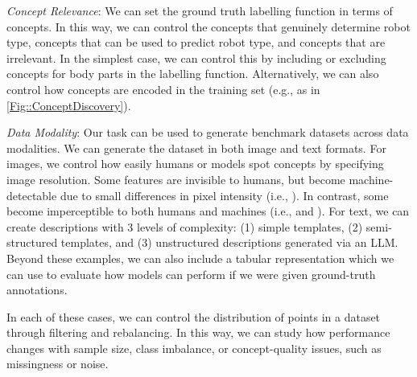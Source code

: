 \documentclass[11pt]{article}
\begin{document}
\noindent \emph{Concept Relevance}: We can set the ground truth labelling function in terms of concepts. In this way, we can control the concepts that genuinely determine robot type, concepts that can be used to predict robot type, and concepts that are irrelevant. In the simplest case, we can control this by including or excluding concepts for body parts in the labelling function. Alternatively, we can also control how concepts are encoded in the training set (e.g.,  as in \cref{Fig::ConceptDiscovery}). %

\noindent \emph{Data Modality}: Our task can be used to generate benchmark datasets across data modalities. We can generate the  dataset in both image and text formats. For images, we control how easily humans or models spot concepts by specifying image resolution. Some features are invisible to humans, but become machine-detectable due to small differences in pixel intensity (i.e., ). In contrast, some become imperceptible to both humans and machines (i.e.,  and ). For text, we can create descriptions with 3 levels of complexity: (1) simple templates, (2) semi-structured templates, and (3) unstructured descriptions generated via an LLM. Beyond these examples, we can also include a tabular representation which we can use to evaluate how models can perform if we were given ground-truth annotations. 

In each of these cases, we can control the distribution of points in a dataset through filtering and rebalancing. In this way, we can study how performance changes with sample size, class imbalance, or concept-quality issues, such as missingness or noise.
\end{document}
